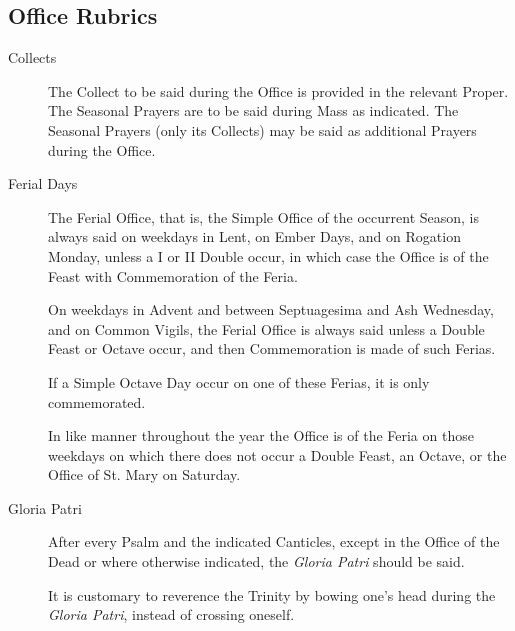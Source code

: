 \subsection{Office Rubrics}
\begin{description}
\item[Collects] The Collect to be said during the Office is provided in the relevant Proper. The Seasonal Prayers are to be said during Mass as indicated. The Seasonal Prayers (only its Collects) may be said as additional Prayers during the Office.
\item[Ferial Days] The Ferial Office, that is, the Simple Office of the occurrent Season, is always said on weekdays in Lent, on Ember Days, and on Rogation Monday, unless a I or II Double occur, in which case the Office is of the Feast with Commemoration of the Feria.\par
On weekdays in Advent and between Septuagesima and Ash Wednesday, and on Common Vigils, the Ferial Office is always said unless a Double Feast or Octave occur, and then Commemoration is made of such Ferias.\par
If a Simple Octave Day occur on one of these Ferias, it is only commemorated.\par
In like manner throughout the year the Office is of the Feria on those weekdays on which there does not occur a Double Feast, an Octave, or the Office of St. Mary on Saturday.
\item[Gloria Patri] After every Psalm and the indicated Canticles, except in the Office of the Dead or where otherwise indicated, the \emph{Gloria Patri} should be said.\par
It is customary to reverence the Trinity by bowing one's head during the \emph{Gloria Patri}, instead of crossing oneself.

\end{description}
